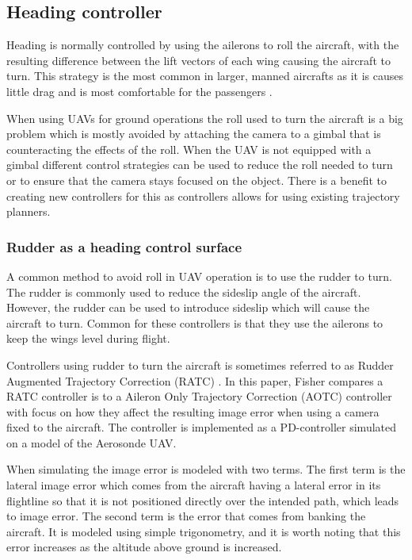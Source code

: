 \subsection{Heading controller}
Heading is normally controlled by using the ailerons to roll the aircraft, with the resulting difference between the lift vectors of each wing causing the aircraft to turn. This strategy is the most common in larger, manned aircrafts as it is causes little drag and is most comfortable for the passengers \cite{skidToTurnMills}.

When using UAVs for ground operations the roll used to turn the aircraft is a big problem which is mostly avoided by attaching the camera to a gimbal that is counteracting the effects of the roll. When the UAV is not equipped with a gimbal different control strategies can be used to reduce the roll needed to turn or to ensure that the camera stays focused on the object. There is a benefit to creating new controllers for this as controllers allows for using existing trajectory planners.


\subsubsection{Rudder as a heading control surface}
A common method to avoid roll in UAV operation is to use the rudder to turn. The rudder is commonly used to reduce the sideslip angle of the aircraft. However, the rudder can be used to introduce sideslip which will cause the aircraft to turn. Common for these controllers is that they use the ailerons to keep the wings level during flight.

Controllers using rudder to turn the aircraft is sometimes referred to as Rudder Augmented Trajectory Correction (RATC) \cite{ratcFISHER}. In this paper, Fisher compares a RATC controller is to a Aileron Only Trajectory Correction (AOTC) controller with focus on how they affect the resulting image error when using a camera fixed to the aircraft. The controller is implemented as a PD-controller simulated on a model of the Aerosonde UAV.

When simulating the image error is modeled with two terms. The first term is the lateral image error which comes from the aircraft having a lateral error in its flightline so that it is not positioned directly over the intended path, which leads to image error. The second term is the error that comes from banking the aircraft. It is modeled using simple trigonometry, and it is worth noting that this error increases as the altitude above ground is increased.

